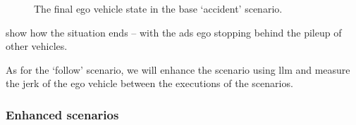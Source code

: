 \begin{figure}[htb]
    \centering
    \hfill
    \caption{The final ego vehicle state in the base `accident' scenario.}
    \label{fig:accidentBaseStoppedVisual}
\end{figure}

 show how the situation ends -- with the \acrshort{ads} ego
stopping behind the pileup of other vehicles.

As for the `follow' scenario, we will enhance the scenario using \acrshort{llm} and measure the
jerk of the ego vehicle between the executions of the scenarios.

\subsubsection{Enhanced scenarios}

